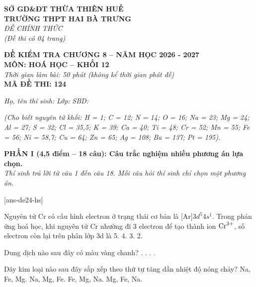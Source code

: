\documentclass[11pt,a4paper]{article}
\begin{document}
\begin{minipage}[t]{0.45\textwidth}
\textbf{SỞ GD\&ĐT THỪA THIÊN HUẾ}\\
\textbf{TRƯỜNG THPT HAI BÀ TRƯNG}\\
\textit{ĐỀ CHÍNH THỨC}\\
\textit{(Đề thi có 04 trang)}
\end{minipage}
\hfill
\begin{minipage}[t]{0.52\textwidth}
\raggedleft
\textbf{\color{hfRed}ĐỀ KIỂM TRA CHƯƠNG 8 -- NĂM HỌC 2026 - 2027}\\
\textbf{MÔN: HOÁ HỌC -- KHỐI 12}\\
\textit{Thời gian làm bài: 50 phút (không kể thời gian phát đề)}\\
\textbf{MÃ ĐỀ THI: 124}
\end{minipage}

\vspace{2pt}
\noindent
\textit{Họ, tên thí sinh:} \dotfill \textit{Lớp:} \dotfill \textit{SBD:} \dotfill

\vspace{1pt}
\noindent
\textit{\footnotesize (Cho biết nguyên tử khối: H = 1; C = 12; N = 14; O = 16; Na = 23; Mg = 24; Al = 27; S = 32; Cl = 35,5; K = 39; Ca = 40; Ti = 48; Cr = 52; Mn = 55; Fe = 56; Ni = 58,7; Cu = 64; Zn = 65; Ag = 108; Ba = 137; Pt = 195).}

\vspace{2pt}
\noindent
\textbf{PHẦN I (4,5 điểm -- 18 câu): Câu trắc nghiệm nhiều phương án lựa chọn.}\\
\textit{Thí sinh trả lời từ câu 1 đến câu 18. Mỗi câu hỏi thí sinh chỉ chọn một phương án.}

[ans-de24-hs]

\begin{ex}
 Nguyên tử Cr có cấu hình electron ở trạng thái cơ bản là $\text{[Ar]}3d^5 4s^1$. Trong phản ứng hoá học, khi nguyên tử Cr nhường đi 3 electron để tạo thành ion $\ce{Cr^3+}$, số electron còn lại trên phân lớp 3d là
\choice
{5.}
{4.}
{3.}
{2.}
\loigiai{}
\end{ex}

\begin{ex}
 Dung dịch nào sau đây có màu vàng chanh?
\choice
{.}
{.}
{.}
{.}
\loigiai{}
\end{ex}

\begin{ex}
 Dãy kim loại nào sau đây sắp xếp theo thứ tự tăng dần nhiệt độ nóng chảy?
\choice
{Na, Fe, Mg.}
{Na, Mg, Fe.}
{Fe, Mg, Na.}
{Mg, Fe, Na.}
\loigiai{}
\end{ex}
\end{document}
